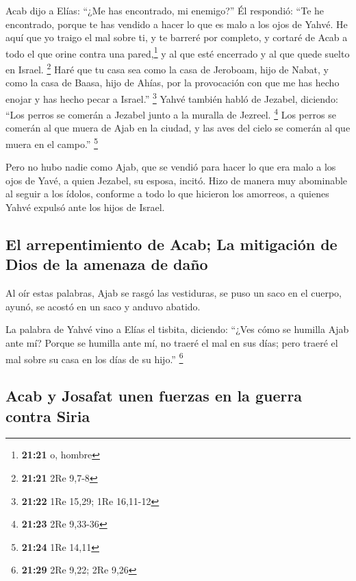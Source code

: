  Acab dijo a Elías: ``¿Me has encontrado, mi enemigo?''
Él respondió: ``Te he encontrado, porque te has vendido a hacer lo que
es malo a los ojos de Yahvé.  He aquí que yo traigo el
mal sobre ti, y te barreré por completo, y cortaré de Acab a todo el que
orine contra una pared,\footnote{\textbf{21:21} o, hombre} y al que esté
encerrado y al que quede suelto en Israel. \footnote{\textbf{21:21} 2Re
  9,7-8}  Haré que tu casa sea como la casa de Jeroboam,
hijo de Nabat, y como la casa de Baasa, hijo de Ahías, por la
provocación con que me has hecho enojar y has hecho pecar a Israel.''
\footnote{\textbf{21:22} 1Re 15,29; 1Re 16,11-12}  Yahvé
también habló de Jezabel, diciendo: ``Los perros se comerán a Jezabel
junto a la muralla de Jezreel. \footnote{\textbf{21:23} 2Re 9,33-36}
 Los perros se comerán al que muera de Ajab en la ciudad,
y las aves del cielo se comerán al que muera en el campo.'' \footnote{\textbf{21:24}
  1Re 14,11}

 Pero no hubo nadie como Ajab, que se vendió para hacer
lo que era malo a los ojos de Yavé, a quien Jezabel, su esposa, incitó.
 Hizo de manera muy abominable al seguir a los ídolos,
conforme a todo lo que hicieron los amorreos, a quienes Yahvé expulsó
ante los hijos de Israel.

\hypertarget{el-arrepentimiento-de-acab-la-mitigaciuxf3n-de-dios-de-la-amenaza-de-dauxf1o}{%
\subsection{El arrepentimiento de Acab; La mitigación de Dios de la
amenaza de
daño}\label{el-arrepentimiento-de-acab-la-mitigaciuxf3n-de-dios-de-la-amenaza-de-dauxf1o}}

 Al oír estas palabras, Ajab se rasgó las vestiduras, se
puso un saco en el cuerpo, ayunó, se acostó en un saco y anduvo abatido.

 La palabra de Yahvé vino a Elías el tisbita, diciendo:
 ``¿Ves cómo se humilla Ajab ante mí? Porque se humilla
ante mí, no traeré el mal en sus días; pero traeré el mal sobre su casa
en los días de su hijo.'' \footnote{\textbf{21:29} 2Re 9,22; 2Re 9,26}

\hypertarget{acab-y-josafat-unen-fuerzas-en-la-guerra-contra-siria}{%
\subsection{Acab y Josafat unen fuerzas en la guerra contra
Siria}\label{acab-y-josafat-unen-fuerzas-en-la-guerra-contra-siria}}

